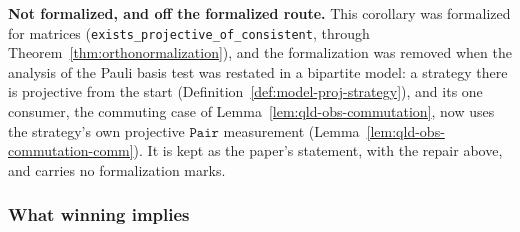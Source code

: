 \textbf{Not formalized, and off the formalized route.} This corollary was formalized for matrices
(\texttt{exists\_projective\_of\_consistent}, through Theorem~\ref{thm:orthonormalization}), and the
formalization was removed when the analysis of the Pauli basis test was restated in a bipartite
model: a strategy there is projective from the start (Definition~\ref{def:model-proj-strategy}),
and its one consumer, the commuting case of Lemma~\ref{lem:qld-obs-commutation}, now uses the
strategy's own projective $\mathtt{Pair}$ measurement (Lemma~\ref{lem:qld-obs-commutation-comm}).
It is kept as the paper's statement, with the repair above, and carries no formalization marks.

\subsubsection{What winning implies}

\effortHard

